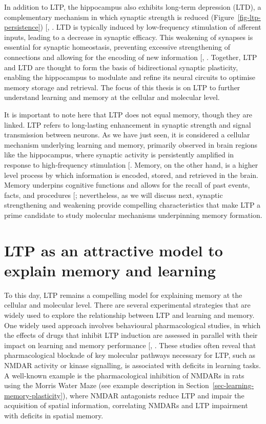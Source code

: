 \documentclass[
  11pt,
  letterpaper,
]{scrreprt}
\begin{document}
In addition to LTP, the hippocampus also exhibits long-term depression
(LTD), a complementary mechanism in which synaptic strength is reduced
(Figure~\ref{fig-ltp-persistence})
{[},
\citeproc{ref-abraham2024Longterm}{41}{]}. LTD is typically induced by
low-frequency stimulation of afferent inputs, leading to a decrease in
synaptic efficacy. This weakening of synapses is essential for synaptic
homeostasis, preventing excessive strengthening of connections and
allowing for the encoding of new information
{[},
\citeproc{ref-nabavi2014Engineering}{43}{]}. Together, LTP and LTD are
thought to form the basis of bidirectional synaptic plasticity, enabling
the hippocampus to modulate and refine its neural circuits to optimise
memory storage and retrieval. The focus of this thesis is on LTP to
further understand learning and memory at the cellular and molecular
level.

It is important to note here that LTP does not equal memory, though they
are linked. LTP refers to long-lasting enhancement in synaptic strength
and signal transmission between neurons. As we have just seen, it is
considered a cellular mechanism underlying learning and memory,
primarily observed in brain regions like the hippocampus, where synaptic
activity is persistently amplified in response to high-frequency
stimulation {[}\citeproc{ref-burgess2002Human}{44}{]}. Memory, on the
other hand, is a higher level process by which information is encoded,
stored, and retrieved in the brain. Memory underpins cognitive functions
and allows for the recall of past events, facts, and procedures
{[}\citeproc{ref-abraham2019Plasticity}{19}{]}; nevertheless, as we will
discuss next, synaptic strengthening and weakening provide compelling
characteristics that make LTP a prime candidate to study molecular
mechanisms underpinning memory formation.

\section{LTP as an attractive model to explain memory and
learning}\label{sec-LTP-to-explain-memory}

To this day, LTP remains a compelling model for explaining memory at the
cellular and molecular level. There are several experimental strategies
that are widely used to explore the relationship between LTP and
learning and memory. One widely used approach involves behavioural
pharmacological studies, in which the effects of drugs that inhibit LTP
induction are assessed in parallel with their impact on learning and
memory performance {[},
\citeproc{ref-najenson2024LTP}{45}{]}. These studies often reveal that
pharmacological blockade of key molecular pathways necessary for LTP,
such as NMDAR activity or kinase signalling, is associated with deficits
in learning tasks. A well-known example is the pharmacological
inhibition of NMDARs in rats using the Morris Water Maze (see example
description in Section~\ref{sec-learning-memory-plasticity}), where
NMDAR antagonists reduce LTP and impair the acquisition of spatial
information, correlating NMDARs and LTP impairment with deficits in
spatial memory.
\end{document}
